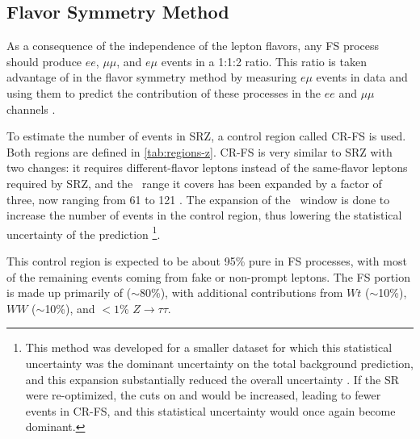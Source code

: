 \subsection{Flavor Symmetry Method}
\label{sec:method-fs}
As a consequence of the independence of the lepton flavors, any \ac{FS} process should produce $ee$, $\mu\mu$, and $e\mu$ events in a 1:1:2 ratio. This ratio is taken advantage of in the flavor symmetry method by measuring $e\mu$ events in data and using them to predict the contribution of these processes in the $ee$ and $\mu\mu$ channels \cite{SUSY-2014-10}.

To estimate the number of events in SRZ, a control region called CR-FS is used. Both regions are defined in \autoref{tab:regions-z}. CR-FS is very similar to SRZ with two changes: it requires different-flavor leptons instead of the same-flavor leptons required by SRZ, and the \mll~range it covers has been expanded by a factor of three, now ranging from 61 to 121 \gev. The expansion of the \mll~window is done to increase the number of events in the control region, thus lowering the statistical uncertainty of the prediction
\footnote{This method was developed for a smaller dataset for which this statistical uncertainty was the dominant uncertainty on the total background prediction, and this expansion substantially reduced the overall uncertainty \cite{zmet}. If the \ac{SR} were re-optimized, the cuts on \HT and \MET would be increased, leading to fewer events in CR-FS, and this statistical uncertainty would once again become dominant.

}. 

This control region is expected to be about 95\% pure in \ac{FS} processes, with most of the remaining events coming from fake or non-prompt leptons. The \ac{FS} portion is made up primarily of \ttbar ($\sim$80\%), with additional contributions from $Wt$ ($\sim$10\%), $WW$ ($\sim$10\%), and $<1$\% $Z \rightarrow \tau\tau$. 

